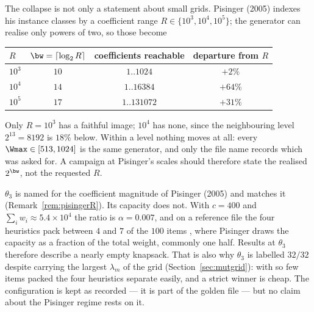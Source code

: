 \begin{remark}\label{rem:pisingerR}
The collapse is not only a statement about small grids. Pisinger (2005) indexes his instance
classes by a coefficient range $R\in\{10^{3},10^{4},10^{5}\}$; the generator can realise only
powers of two, so those become 
\begin{center}\small
\begin{tabular}{@{}lccc@{}}
\toprule
$R$ & $\bw=\lceil\log_2R\rceil$ & coefficients reachable & departure from $R$ \\
\midrule
$10^{3}$ & $10$ & $1..1024$   & $+2\%$ \\
$10^{4}$ & $14$ & $1..16384$  & $+64\%$ \\
$10^{5}$ & $17$ & $1..131072$ & $+31\%$ \\
\bottomrule
\end{tabular}
\end{center}
Only $R=10^{3}$ has a faithful image; $10^{4}$ has none, since the neighbouring level
$2^{13}=8192$ is $18\%$ below. Within a level nothing moves at all: every $\Wmax\in[513,1024]$
is the same generator, and only the file name records which was asked for. A campaign at
Pisinger's scales should therefore state the realised $2^{\bw}$, not the requested $R$.
\end{remark}

\begin{remark}\label{rem:theta3alpha}
$\theta_3$ is named for the coefficient magnitude of Pisinger (2005) and matches it
(Remark~\ref{rem:pisingerR}). Its capacity does not. With $c=400$ and
$\sum_iw_i\approx5.4\times10^{4}$ the ratio is $\alpha=0.007$, and on a reference file the
four heuristics pack between $4$ and $7$ of the $100$ items , where Pisinger draws
the capacity as a fraction of the total weight, commonly one half. Results at $\theta_3$
therefore describe a nearly empty knapsack. That is also why $\theta_3$ is labelled $32/32$
despite carrying the largest $\lambda_m$ of the grid (Section~\ref{sec:mutgrid}): with so few
items packed the four heuristics separate easily, and a strict winner is cheap. The
configuration is kept as recorded --- it is part of the golden file --- but no claim about
the Pisinger regime rests on it.
\end{remark}

